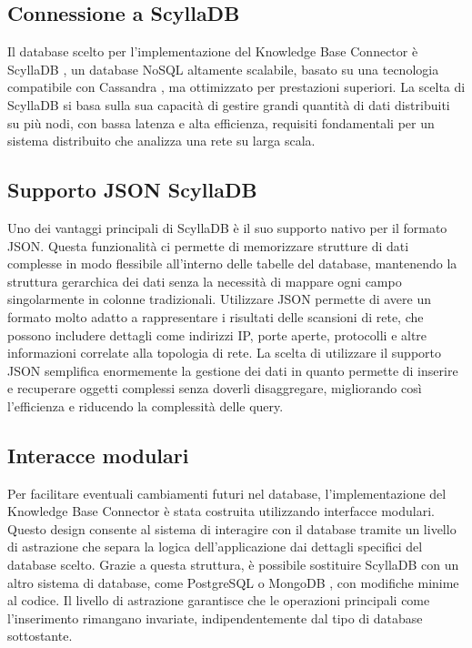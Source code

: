 \documentclass[target=bach,aauheader=,style=]{thud}
\begin{document}
\subsection{Connessione a ScyllaDB}
Il database scelto per l’implementazione del Knowledge Base Connector è ScyllaDB \cite{scylladb2024}, un database NoSQL altamente scalabile, basato su una tecnologia compatibile con Cassandra \cite{cassandra2024}, ma ottimizzato per prestazioni superiori. La scelta di ScyllaDB si basa sulla sua capacità di gestire grandi quantità di dati distribuiti su più nodi, con bassa latenza e alta efficienza, requisiti fondamentali per un sistema distribuito che analizza una rete su larga scala.

\subsection{Supporto JSON ScyllaDB}
Uno dei vantaggi principali di ScyllaDB è il suo supporto nativo per il formato JSON. Questa funzionalità ci permette di memorizzare strutture di dati complesse in modo flessibile all'interno delle tabelle del database, mantenendo la struttura gerarchica dei dati senza la necessità di mappare ogni campo singolarmente in colonne tradizionali. Utilizzare JSON permette di avere un formato molto adatto a rappresentare i risultati delle scansioni di rete, che possono includere dettagli come indirizzi IP, porte aperte, protocolli e altre informazioni correlate alla topologia di rete.
\newline
La scelta di utilizzare il supporto JSON semplifica enormemente la gestione dei dati in quanto permette di inserire e recuperare oggetti complessi senza doverli disaggregare, migliorando così l'efficienza e riducendo la complessità delle query.

\subsection{Interacce modulari}
Per facilitare eventuali cambiamenti futuri nel database, l’implementazione del Knowledge Base Connector è stata costruita utilizzando interfacce modulari. Questo design consente al sistema di interagire con il database tramite un livello di astrazione che separa la logica dell'applicazione dai dettagli specifici del database scelto.
\newline
Grazie a questa struttura, è possibile sostituire ScyllaDB con un altro sistema di database, come PostgreSQL \cite{postgresql2024} o MongoDB \cite{mongodb2024}, con modifiche minime al codice. Il livello di astrazione garantisce che le operazioni principali come l’inserimento rimangano invariate, indipendentemente dal tipo di database sottostante.
\end{document}

